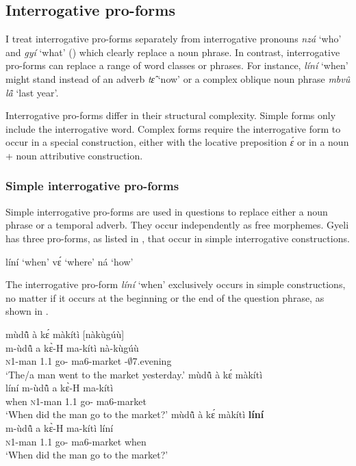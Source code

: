 \subsection{Interrogative pro-forms}
\label{sec:INTERR}

I treat interrogative pro-forms separately from interrogative pronouns {\itshape nzá} `who' and {\itshape gyí} `what' () which clearly replace a noun phrase. In contrast, interrogative pro-forms can replace a range of word classes or phrases. For instance, {\itshape líní} `when' might stand instead of an adverb {\itshape tɛ̂} `now' or a complex oblique noun phrase {\itshape mbvû lã̂} `last year'. 

Interrogative pro-forms differ in their structural complexity. Simple forms only include the interrogative word. Complex forms require the interrogative form to occur in a special construction, either with the locative preposition {\itshape ɛ́} or in a noun + noun attributive construction.




\subsubsection{Simple interrogative pro-forms}
\label{sec:INTERRS}

Simple interrogative pro-forms are used in questions to replace either a noun phrase or a temporal adverb. They occur independently as free morphemes. Gyeli has three pro-forms, as listed in ,  that occur in simple interrogative constructions.

\ea\label{simpinterr}
  \ea  líní `when'
    \ex vɛ́ `where'
    \ex ná `how'
    \z
\z

The interrogative pro-form {\itshape líní} `when' exclusively occurs in simple constructions, no matter if it occurs at the beginning or the end of the question phrase, as shown in .

\ea \label{lini}
  \ea  \label{lini1}
  \glll    mùdũ̂ à kɛ́ màkítì [nàkùgúù] \\
      m-ùdũ̂ a kɛ̀-H ma-kítì {\db}nà-kùgúù\\
              \textsc{n}1-man 1.{\PST}1 go-{\R} ma6-market {\db}{\SIM}-$\emptyset$7.evening \\
   \trans `The/a man went to the market yesterday.'
\ex\label{lini2}
  mùdũ̂ à kɛ́ màkítì  \\
           líní m-ùdũ̂ a kɛ̀-H ma-kítì\\
             when \textsc{n}1-man 1.{\PST}1 go-{\R} ma6-market \\
    \trans `When did the man go to the market?'
\ex\label{lini3}
 \glll     mùdũ̂ à kɛ́ màkítì {\bfseries líní} \\
            m-ùdũ̂ a kɛ̀-H ma-kítì líní\\
              \textsc{n}1-man 1.{\PST}1 go-{\R} ma6-market when \\
    \trans `When did the man go to the market?'
\z
\z

